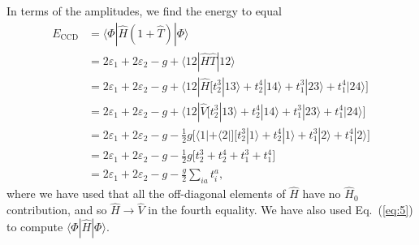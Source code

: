 \documentclass[a4paper]{article}
\newcommand{\eq} [1]{Eq.\ (\ref{eq:#1})}
\newcommand{\nn}{\nonumber}
\begin{document}
In terms of the amplitudes, we find the energy to equal
\begin{align}
E_\text{CCD} &= \langle \Phi | \hat H (1+  \hat T ) | \Phi \rangle \nn\\
%
&= 2\varepsilon_1 + 2\varepsilon_2 - g + \langle 12 | \hat H \hat T| 12 \rangle \nn\\
%
&= 2\varepsilon_1 + 2\varepsilon_2 - g + \langle 12 | \hat H \Big[ t^3_2|13\rangle + t^4_2|14\rangle + t^3_1|23\rangle + t^4_1|24\rangle \Big] \nn\\
%
&= 2\varepsilon_1 + 2\varepsilon_2 - g + \langle 12 | \hat V \Big[ t^3_2|13\rangle + t^4_2|14\rangle + t^3_1|23\rangle + t^4_1|24\rangle \Big] \nn\\
%
&= 2\varepsilon_1 + 2\varepsilon_2 - g - \frac{1}{2}g\Big[\langle 1| + \langle 2 | \Big] \Big[ t^3_2|1\rangle + t^4_2|1\rangle + t^3_1|2\rangle + t^4_1|2\rangle \Big] \nn\\
%
&=  2\varepsilon_1 + 2\varepsilon_2 - g - \frac{1}{2}g\Big[ t^3_2+ t^4_2+ t^3_1+ t^4_1 \Big] \nn\\
%
&=  2\varepsilon_1 + 2\varepsilon_2 - g - \frac{g}{2}\sum_{ia} t^a_i,
\end{align}
where we have used that all the off-diagonal elements of $\hat H$ have no $\hat H_0$ contribution, and so $\hat H\rightarrow \hat V$ in the fourth equality. We have also used \eq{5} to compute $\langle \Phi |\hat H | \Phi\rangle$.
\end{document}

